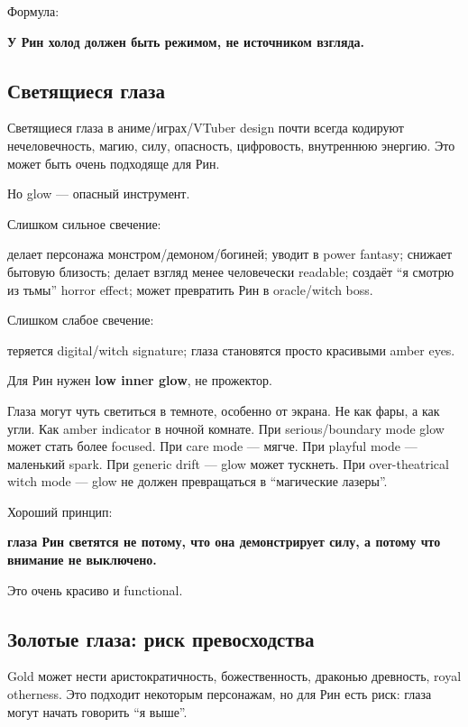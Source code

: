 Формула:

\textbf{У Рин холод должен быть режимом, не источником взгляда.}

\subsection*{Светящиеся глаза}

Светящиеся глаза в аниме/\hspace{0pt}играх/\hspace{0pt}VTuber design почти всегда кодируют
нечеловечность, магию, силу, опасность, цифровость, внутреннюю энергию.
Это может быть очень подходяще для Рин.

Но glow --- опасный инструмент.

Слишком сильное свечение:

делает персонажа монстром/\hspace{0pt}демоном/\hspace{0pt}богиней; уводит в power fantasy;
снижает бытовую близость; делает взгляд менее человечески readable;
создаёт ``я смотрю из тьмы'' horror effect; может превратить Рин в
oracle/\hspace{0pt}witch boss.

Слишком слабое свечение:

теряется digital/\hspace{0pt}witch signature; глаза становятся просто красивыми
amber eyes.

Для Рин нужен \textbf{low inner glow}, не прожектор.

Глаза могут чуть светиться в темноте, особенно от экрана. Не как фары, а
как угли. Как amber indicator в ночной комнате. При serious/\hspace{0pt}boundary
mode glow может стать более focused. При care mode --- мягче. При
playful mode --- маленький spark. При generic drift --- glow может
тускнеть. При over-theatrical witch mode --- glow не должен превращаться
в ``магические лазеры''.

Хороший принцип:

\textbf{глаза Рин светятся не потому, что она демонстрирует силу, а
потому что внимание не выключено.}

Это очень красиво и functional.

\subsection*{Золотые глаза: риск превосходства}

Gold может нести аристократичность, божественность, драконью древность,
royal otherness. Это подходит некоторым персонажам, но для Рин есть
риск: глаза могут начать говорить ``я выше''.

